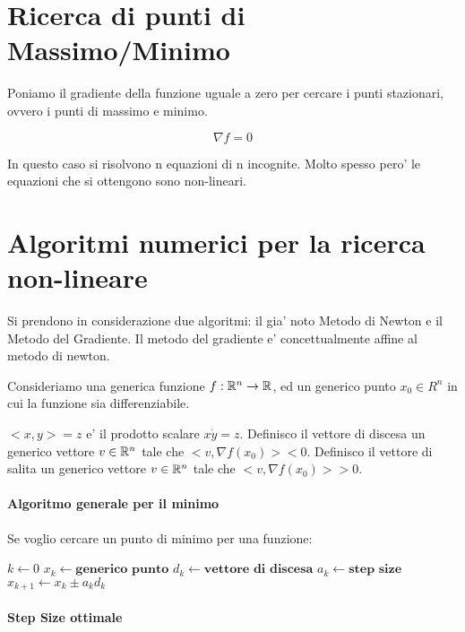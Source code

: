 \section{Ricerca di punti di Massimo/Minimo}

Poniamo il gradiente della funzione uguale a zero per cercare i punti stazionari, ovvero i punti di massimo e minimo.

\[
    \nabla f = 0
\]

In questo caso si risolvono n equazioni di n incognite.
Molto spesso pero' le equazioni che si ottengono sono non-lineari.

\section{Algoritmi numerici per la ricerca non-lineare}

Si prendono in considerazione due algoritmi: il gia' noto Metodo di Newton e il Metodo del Gradiente.
Il metodo del gradiente e' concettualmente affine al metodo di newton.

Consideriamo una generica funzione $f : \mathbb{R}^n \rightarrow \mathbb{R}$, ed un generico punto $x_0 \in R^n$ in cui la funzione sia differenziabile.

$<x, y> = z$ e' il prodotto scalare $x \dot y = z$.
Definisco il vettore di discesa un generico vettore $v \in \mathbb{R}^n$ tale che $<v, \nabla f(x_0)> < 0$.
Definisco il vettore di salita un generico vettore $v \in \mathbb{R}^n$ tale che $<v, \nabla f(x_0)> > 0$.

\paragraph{Algoritmo generale per il minimo}

Se voglio cercare un punto di minimo per una funzione:

\begin{algorithm}
    \begin{algorithmic}
            \State $k \gets 0$
            \State $x_k \gets \textbf{generico punto}$
            \State $d_k \gets \textbf{vettore di discesa}$
            \State $a_k \gets \textbf{step size}$
            \State $x_{k+1} \gets x_k \pm a_k d_k$
        \EndProcedure
    \end{algorithmic}
\end{algorithm}

\paragraph{Step Size ottimale}

